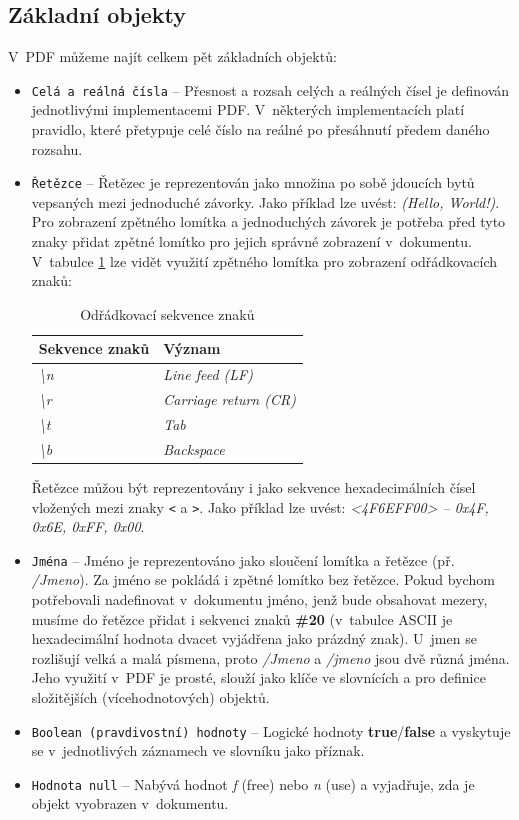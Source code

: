 \subsection{Základní objekty}
V~PDF můžeme najít celkem pět základních objektů:
	\begin{itemize}
		\item \verb|Celá a reálná čísla| --  Přesnost a rozsah celých a reálných čísel je definován jednotlivými implementacemi PDF. V~některých implementacích platí pravidlo, které přetypuje celé číslo na reálné po přesáhnutí předem daného rozsahu.
		\item \verb|Řetězce| -- Řetězec je reprezentován jako množina po sobě jdoucích bytů vepsaných mezi jednoduché závorky. Jako příklad lze uvést: \textit{(Hello, World!)}. Pro zobrazení zpětného lomítka a jednoduchých závorek je potřeba před tyto znaky přidat zpětné lomítko pro jejich správné zobrazení v~dokumentu. V~tabulce \ref{tab:table_escaped} lze vidět využití zpětného lomítka pro zobrazení odřádkovacích znaků:
			\begin{table}[h!]
			\centering
			\begin{tabular}{|l|l|} 
			\hline
			\textbf{Sekvence znaků}    & \textbf{Význam}                \\ 
			\hline
			\textit{\textbackslash{}n} & \textit{Line feed (LF)}        \\ 
			\hline
			\textit{\textbackslash{}r} & \textit{Carriage return (CR)}  \\ 
			\hline
			\textit{\textbackslash{}t} & \textit{Tab}                   \\ 
			\hline
			\textit{\textbackslash{}b} & \textit{Backspace}                      \\
			\hline
			\end{tabular}
			\caption{Odřádkovací sekvence znaků}
			\label{tab:table_escaped}
			\end{table}
		\newline Řetězce můžou být reprezentovány i jako sekvence hexadecimálních čísel vložených mezi znaky \verb|<| a \verb|>|. 
		\newline Jako příklad lze uvést: \textit{<4F6EFF00> -- 0x4F, 0x6E, 0xFF, 0x00}.

		\item \verb|Jména| -- Jméno je reprezentováno jako sloučení lomítka a řetězce (př. \textit{/Jmeno}). Za jméno se pokládá i zpětné lomítko bez řetězce. Pokud bychom potřebovali nadefinovat v~dokumentu jméno, jenž bude obsahovat mezery, musíme do řetězce přidat i sekvenci znaků \textbf{\#20} (v~tabulce ASCII je hexadecimální hodnota dvacet vyjádřena jako prázdný znak). U~jmen se rozlišují velká a malá písmena, proto \textit{/Jmeno} a \textit{/jmeno} jsou dvě různá jména. Jeho využití v~PDF je prosté, slouží jako klíče ve slovnících a pro definice složitějších (vícehodnotových) objektů.
		\item \verb|Boolean (pravdivostní) hodnoty| -- Logické hodnoty \textbf{true}/\textbf{false} a vyskytuje se v~jednotlivých záznamech ve slovníku jako příznak.
		\item \verb|Hodnota null| -- Nabývá hodnot \textit{f} (free) nebo \textit{n} (use) a vyjadřuje, zda je objekt vyobrazen v~dokumentu.
	\end{itemize}
